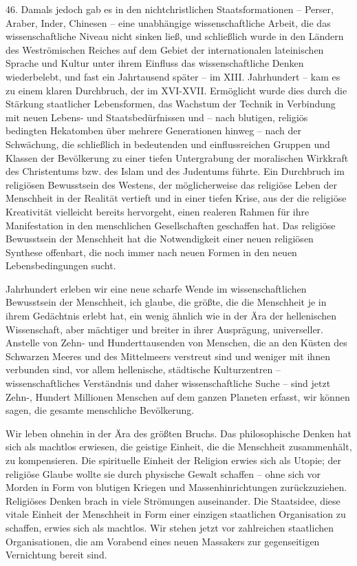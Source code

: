 \documentclass[11pt,a4paper]{book}
\begin{document}
46. Damals jedoch gab es in den nichtchristlichen Staatsformationen -- Perser, Araber, Inder, Chinesen -- eine unabhängige wissenschaftliche Arbeit, die das wissenschaftliche Niveau nicht sinken ließ, und schließlich wurde in den Ländern des Weströmischen Reiches auf dem Gebiet der internationalen lateinischen Sprache und Kultur unter ihrem Einfluss das wissenschaftliche Denken wiederbelebt, und fast ein Jahrtausend später -- im XIII. Jahrhundert -- kam es zu einem klaren Durchbruch, der im XVI-XVII. Ermöglicht wurde dies durch die Stärkung staatlicher Lebensformen, das Wachstum der Technik in Verbindung mit neuen Lebens- und Staatsbedürfnissen und -- nach blutigen, religiös bedingten Hekatomben über mehrere Generationen hinweg -- nach der Schwächung, die schließlich in bedeutenden und einflussreichen Gruppen und Klassen der Bevölkerung zu einer tiefen Untergrabung der moralischen Wirkkraft des Christentums bzw. des Islam und des Judentums führte. Ein Durchbruch im religiösen Bewusstsein des Westens, der möglicherweise das religiöse Leben der Menschheit in der Realität vertieft und in einer tiefen Krise, aus der die religiöse Kreativität vielleicht bereits hervorgeht, einen realeren Rahmen für ihre Manifestation in den menschlichen Gesellschaften geschaffen hat. Das religiöse Bewusstsein der Menschheit hat die Notwendigkeit einer neuen religiösen Synthese offenbart, die noch immer nach neuen Formen in den neuen Lebensbedingungen sucht. 

Jahrhundert erleben wir eine neue scharfe Wende im wissenschaftlichen Bewusstsein der Menschheit, ich glaube, die größte, die die Menschheit je in ihrem Gedächtnis erlebt hat, ein wenig ähnlich wie in der Ära der hellenischen Wissenschaft, aber mächtiger und breiter in ihrer Ausprägung, universeller. Anstelle von Zehn- und Hunderttausenden von Menschen, die an den Küsten des Schwarzen Meeres und des Mittelmeers verstreut sind und weniger mit ihnen verbunden sind, vor allem hellenische, städtische Kulturzentren -- wissenschaftliches Verständnis und daher wissenschaftliche Suche -- sind jetzt Zehn-, Hundert Millionen Menschen auf dem ganzen Planeten erfasst, wir können sagen, die gesamte menschliche Bevölkerung. 

Wir leben ohnehin in der Ära des größten Bruchs. Das philosophische Denken hat sich als machtlos erwiesen, die geistige Einheit, die die Menschheit zusammenhält, zu kompensieren. Die spirituelle Einheit der Religion erwies sich als Utopie; der religiöse Glaube wollte sie durch physische Gewalt schaffen -- ohne sich vor Morden in Form von blutigen Kriegen und Massenhinrichtungen zurückzuziehen. Religiöses Denken brach in viele Strömungen auseinander. Die Staatsidee, diese vitale Einheit der Menschheit in Form einer einzigen staatlichen Organisation zu schaffen, erwies sich als machtlos. Wir stehen jetzt vor zahlreichen staatlichen Organisationen, die am Vorabend eines neuen Massakers zur gegenseitigen Vernichtung bereit sind. 
\end{document}
